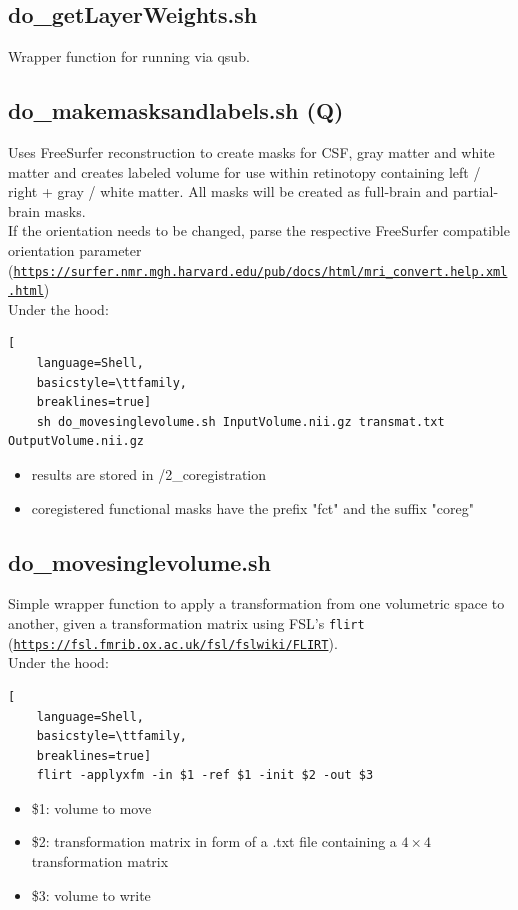 \documentclass[12pt,a4paper]{scrartcl}
\begin{document}
\subsection{do\_getLayerWeights.sh}
\label{sh:getLyrW}
Wrapper function for running \texttt{} via qsub.\\

\subsection{do\_makemasksandlabels.sh (Q)}
\label{sh:msklbl}
Uses FreeSurfer reconstruction to create masks for CSF, gray matter and white matter and creates labeled volume for use within retinotopy containing left / right + gray / white matter. All masks will be created as full-brain and partial-brain masks.\\

\noindent If the orientation needs to be changed, parse the respective FreeSurfer compatible orientation parameter (\href{https://surfer.nmr.mgh.harvard.edu/pub/docs/html/mri_convert.help.xml.html}{\nolinkurl{https://surfer.nmr.mgh.harvard.edu/pub/docs/html/mri\_convert.help.xml.html}})\\

\noindent Under the hood:
\begin{lstlisting}[
    language=Shell,
    basicstyle=\ttfamily,
    breaklines=true]
    sh do_movesinglevolume.sh InputVolume.nii.gz transmat.txt OutputVolume.nii.gz
\end{lstlisting}
\begin{itemize}
\item results are stored in /2\_coregistration
\item coregistered functional masks have the prefix "fct" and the suffix "coreg"
\end{itemize}

\subsection{do\_movesinglevolume.sh}
\label{sh:move}
Simple wrapper function to apply a transformation from one volumetric space to another, given a transformation matrix using FSL's \texttt{flirt} (\href{https://fsl.fmrib.ox.ac.uk/fsl/fslwiki/FLIRT}{\nolinkurl{https://fsl.fmrib.ox.ac.uk/fsl/fslwiki/FLIRT}}).\\

\noindent Under the hood:
\begin{lstlisting}[
    language=Shell,
    basicstyle=\ttfamily,
    breaklines=true]
    flirt -applyxfm -in $1 -ref $1 -init $2 -out $3
\end{lstlisting}
\begin{itemize}
\item \$1: volume to move
\item \$2: transformation matrix in form of a .txt file containing a $4\times4$ transformation matrix
\item \$3: volume to write
\end{itemize}
\end{document}
